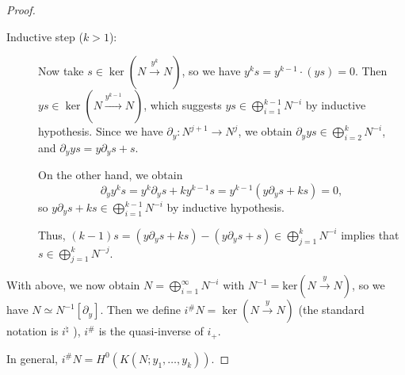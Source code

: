 \begin{proof}
\begin{description}
        \item[Inductive step ($k>1$):] Now take $s\in \ker(N \xrightarrow{y^{k}}N)$, so we have $y^{k}s=y^{k-1} \cdot(ys)=0$. Then $ys \in \ker(N \xrightarrow{y^{k-1}}N)$, which suggests $ys \in \bigoplus\limits_{i=1}^{k-1} N^{-i}$ by inductive hypothesis.
            Since we have $\partial_{y}: N^{j+1}\rightarrow N^{j}$, we obtain $\partial_{y}ys \in \bigoplus\limits_{i=2}^{k} N^{-i}$, and $\partial_{y}ys=y\partial_{y}s+s$.

            On the other hand, we obtain
            \[
                \partial_{y}y^{k}s=y^{k}\partial_{y}s+ky^{k-1}s=y^{k-1}(y\partial_{y}s+ks)=0,
            \]
            so $y\partial_{y}s+ks\in \bigoplus\limits_{i=1}^{k-1} N^{-i}$ by inductive hypothesis.

            Thus, $(k-1)s=(y\partial_{y}s+ks)-(y\partial_{y}s+s)\in \bigoplus_{j=1}^{k} N^{-i}$ implies that $s\in \bigoplus_{j=1}^{k} N^{-j}$.
    \end{description}

    With above, we now obtain $N=\bigoplus\limits_{i=1}^{\infty}N^{-i}$ with $N^{-1}=\mathrm{ker}(N\xrightarrow{y}N)$, so we have $N\simeq N^{-1}[\partial_{y}]$. Then we define $i^{\#}N = \ker(N \xrightarrow{y} N)$ (the standard notation is $i^{\natural}$ \cite[Thm.~1.6.1.]{hotta2008d}), $i^{\#}$ is the quasi-inverse of $i_{+}$.

    In general, $i^{\#}N = H^{0}(K(N; y_{1}, \ldots, y_{k}))$.
\end{proof}

